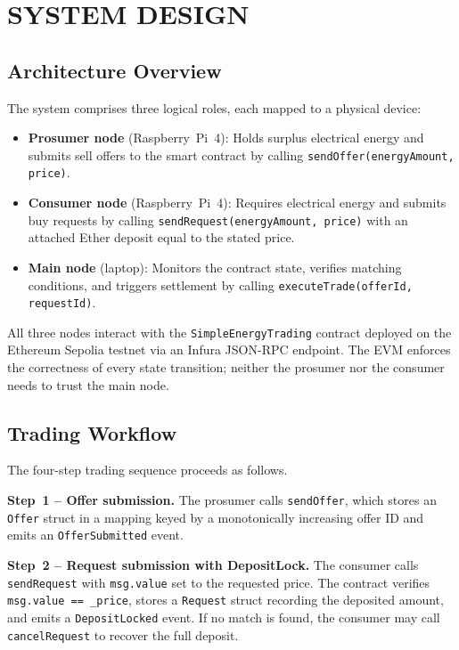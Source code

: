 \documentclass{IEEEoj}
\begin{document}
\section{SYSTEM DESIGN}
\label{sec:design}

\subsection{Architecture Overview}

The system comprises three logical roles, each mapped to a physical device:

\begin{itemize}
  \item \textbf{Prosumer node} (Raspberry~Pi~4): Holds surplus electrical
        energy and submits sell offers to the smart contract by calling
        \texttt{sendOffer(energyAmount, price)}.

  \item \textbf{Consumer node} (Raspberry~Pi~4): Requires electrical energy
        and submits buy requests by calling \texttt{sendRequest(energyAmount,
        price)} with an attached Ether deposit equal to the stated price.

  \item \textbf{Main node} (laptop): Monitors the contract state, verifies
        matching conditions, and triggers settlement by calling
        \texttt{executeTrade(offerId, requestId)}.
\end{itemize}

All three nodes interact with the \texttt{SimpleEnergyTrading} contract
deployed on the Ethereum Sepolia testnet via an Infura JSON-RPC endpoint.
The EVM enforces the correctness of every state transition; neither the
prosumer nor the consumer needs to trust the main node.

\subsection{Trading Workflow}

The four-step trading sequence proceeds as follows.

\textbf{Step~1 -- Offer submission.}
The prosumer calls \texttt{sendOffer}, which stores an \texttt{Offer} struct
in a mapping keyed by a monotonically increasing offer ID and emits an
\texttt{OfferSubmitted} event.

\textbf{Step~2 -- Request submission with DepositLock.}
The consumer calls \texttt{sendRequest} with \texttt{msg.value} set to
the requested price.
The contract verifies \texttt{msg.value == \_price}, stores a
\texttt{Request} struct recording the deposited amount, and emits a
\texttt{DepositLocked} event.
If no match is found, the consumer may call \texttt{cancelRequest} to
recover the full deposit.
\end{document}
